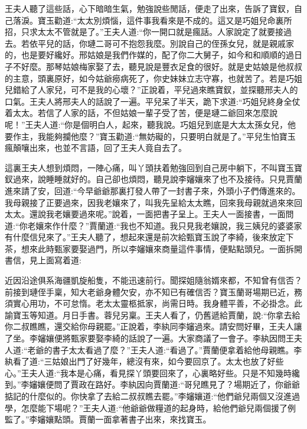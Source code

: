 \begin{parag}
    王夫人聽了這些話，心下暗暗生氣，勉強說些閒話，便走了出來，告訴了寶釵，自己落淚。寶玉勸道:“太太別煩惱，這件事我看來是不成的。這又是巧姐兒命裏所招，只求太太不管就是了。”王夫人道:“你一開口就是瘋話。人家說定了就要接過去。若依平兒的話，你璉二哥可不抱怨我麼。別說自己的侄孫女兒，就是親戚家的，也是要好纔好。邢姑娘是我們作媒的，配了你二大舅子，如今和和順順的過日子不好麼。那琴姑娘梅家娶了去，聽見說是豐衣足食的很好。就是史姑娘是他叔叔的主意，頭裏原好，如今姑爺癆病死了，你史妹妹立志守寡，也就苦了。若是巧姐兒錯給了人家兒，可不是我的心壞？”正說着，平兒過來瞧寶釵，並探聽邢夫人的口氣。王夫人將邢夫人的話說了一遍。平兒呆了半天，跪下求道:“巧姐兒終身全仗着太太。若信了人家的話，不但姑娘一輩子受了苦，便是璉二爺回來怎麼說呢！”王夫人道:“你是個明白人，起來，聽我說。巧姐兒到底是大太太孫女兒，他要作主，我能夠攔他麼？”寶玉勸道:“無妨礙的，只要明白就是了。”平兒生怕寶玉瘋顛嚷出來，也並不言語，回了王夫人竟自去了。
\end{parag}


\begin{parag}
    這裏王夫人想到煩悶，一陣心痛，叫丫頭扶着勉強回到自己房中躺下，不叫寶玉寶釵過來，說睡睡就好的。自己卻也煩悶，聽見說李嬸孃來了也不及接待。只見賈蘭進來請了安，回道:“今早爺爺那裏打發人帶了一封書子來，外頭小子們傳進來的。我母親接了正要過來，因我老孃來了，叫我先呈給太太瞧，回來我母親就過來來回太太。還說我老孃要過來呢。”說着，一面把書子呈上。王夫人一面接書，一面問道:“你老孃來作什麼？”賈蘭道:“我也不知道。我只見我老孃說，我三姨兒的婆婆家有什麼信兒來了。”王夫人聽了，想起來還是前次給甄寶玉說了李綺，後來放定下茶，想來此時甄家要娶過門，所以李嬸孃來商量這件事情，便點點頭兒。一面拆開書信，見上面寫着道:
\end{parag}


\begin{parag}
    近因沿途俱系海疆凱旋船隻，不能迅速前行。聞探姐隨翁婿來都，不知曾有信否？前接到璉侄手稟，知大老爺身體欠安，亦不知已有確信否？寶玉蘭哥場期已近，務須實心用功，不可怠惰。老太太靈柩抵家，尚需日時。我身體平善，不必掛念。此諭寶玉等知道。月日手書。蓉兒另稟。王夫人看了，仍舊遞給賈蘭，說:“你拿去給你二叔瞧瞧，還交給你母親罷。”正說着，李紈同李嬸過來。請安問好畢，王夫人讓了坐。李嬸孃便將甄家要娶李綺的話說了一遍。大家商議了一會子。李紈因問王夫人道:“老爺的書子太太看過了麼？”王夫人道:“看過了。”賈蘭便拿着給他母親瞧。李紈看了道:“三姑娘出門了好幾年，總沒有來，如今要回京了。太太也放了好些心。”王夫人道:“我本是心痛，看見探丫頭要回來了，心裏略好些。只是不知幾時纔到。”李嬸孃便問了賈政在路好。李紈因向賈蘭道:“哥兒瞧見了？場期近了，你爺爺掂記的什麼似的。你快拿了去給二叔叔瞧去罷。”李嬸孃道:“他們爺兒兩個又沒進過學，怎麼能下場呢？”王夫人道:“他爺爺做糧道的起身時，給他們爺兒兩個援了例監了。”李嬸孃點頭。賈蘭一面拿著書子出來，來找寶玉。
\end{parag}


